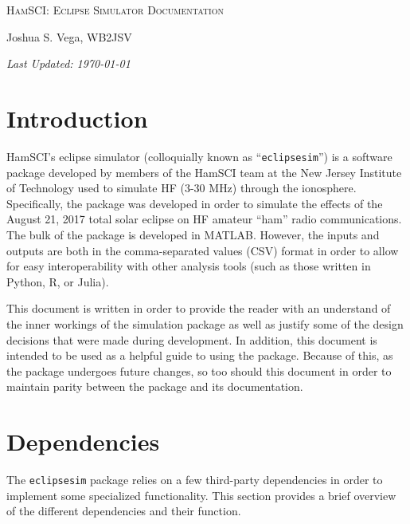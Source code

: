 \documentclass[12pt,letterpaper]{article}
\begin{document}
\begin{center}
  {\scshape\Large HamSCI: Eclipse Simulator Documentation\par}
  \vspace{1em}
  {\large Joshua S. Vega, WB2JSV\par}
  \vspace{1em}
  {\itshape\large Last Updated: \today\par}
\end{center}

\tableofcontents

\newpage

%
%
\section{Introduction}
\label{sec:introduction}

HamSCI's eclipse simulator (colloquially known as ``\texttt{eclipsesim}'') is a
software package developed by members of the HamSCI team at the New Jersey
Institute of Technology used to simulate HF (3-30 $\si{\mega\hertz}$) through
the ionosphere. Specifically, the package was developed in order to simulate the
effects of the August 21, 2017 total solar eclipse on HF amateur ``ham'' radio
communications. The bulk of the package is developed in MATLAB. However, the
inputs and outputs are both in the comma-separated values (CSV) format in order
to allow for easy interoperability with other analysis tools (such as those
written in Python, R, or Julia).

This document is written in order to provide the reader with an understand of
the inner workings of the simulation package as well as justify some of the
design decisions that were made during development. In addition, this document
is intended to be used as a helpful guide to using the package. Because of this,
as the package undergoes future changes, so too should this document in order to
maintain parity between the package and its documentation.

%
%
\section{Dependencies}
\label{sec:dependencies}

The \texttt{eclipsesim} package relies on a few third-party dependencies in
order to implement some specialized functionality. This section provides a brief
overview of the different dependencies and their function.
\end{document}
